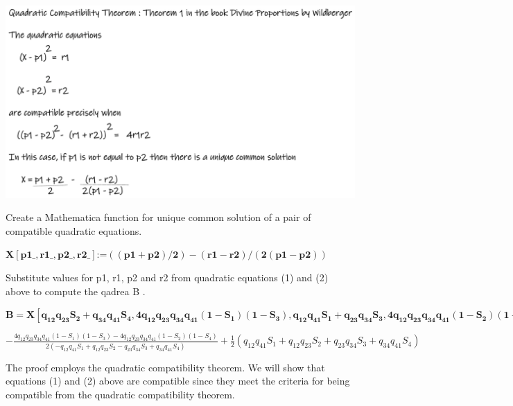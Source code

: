 \documentclass{article}
\begin{document}
\includegraphics{quadreaOfHyperbolicProjectiveQuadranglelProofPart_1_gr1.eps}

Create a Mathematica function for unique common solution of a pair of compatible quadratic equations.

\begin{doublespace}
\noindent\(\pmb{X[\text{p1$\_$},\text{r1$\_$},\text{p2$\_$},\text{r2$\_$}]\text{:=}((\text{p1}+\text{p2})/2)-(\text{r1}-\text{r2})/(2(\text{p1}-\text{p2}))}\)
\end{doublespace}

Substitute values for p1, r1, p2 and r2 from quadratic equations (1) and (2) above to compute the qadrea B .

\begin{doublespace}
\noindent\(\pmb{B=X\left[q_{12}q_{23}S_2+q_{34}q_{41}S_4,4q_{12}q_{23}q_{34}q_{41}\left(1-S_1\right)\left(1-S_3\right),q_{12}q_{41}S_1+q_{23}q_{34}S_3,4q_{12}q_{23}q_{34}q_{41}\left(1-S_2\right)\left(1-S_4\right)\right]}\)
\end{doublespace}

\begin{doublespace}
\noindent\(-\frac{4 q_{12} q_{23} q_{34} q_{41} \left(1-S_1\right) \left(1-S_3\right)-4 q_{12} q_{23} q_{34} q_{41} \left(1-S_2\right) \left(1-S_4\right)}{2
\left(-q_{12} q_{41} S_1+q_{12} q_{23} S_2-q_{23} q_{34} S_3+q_{34} q_{41} S_4\right)}+\frac{1}{2} \left(q_{12} q_{41} S_1+q_{12} q_{23} S_2+q_{23}
q_{34} S_3+q_{34} q_{41} S_4\right)\)
\end{doublespace}



The proof employs the quadratic compatibility theorem. We will show that equations (1) and (2) above are compatible since they meet the criteria
for being compatible from the quadratic compatibility theorem. 
\end{document}
